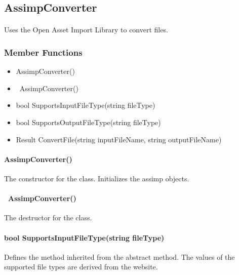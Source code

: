 \hypertarget{fileconversion_assimpconverter}
{
    \label{fileconversion_assimpconverter}
}

\subsection{AssimpConverter}
    \paragraph{}
        Uses the Open Asset Import Library to convert files.

    \subsubsection{Member Functions}

        \begin{itemize}
            \item AssimpConverter()
            \item ~AssimpConverter()
            \item bool SupportsInputFileType(string fileType)
            \item bool SupportsOutputFileType(string fileType)
            \item Result ConvertFile(string inputFileName, string outputFileName)
        \end{itemize}

        \paragraph{AssimpConverter()}
            \hfill \break
            The constructor for the class. Initializes the assimp objects.   
        
        \paragraph{~AssimpConverter()}
            \hfill \break
            The destructor for the class.

        \paragraph{bool SupportsInputFileType(string fileType)}
            \hfill \break
            Defines the method inherited from the abstract method.  The values of the supported file types are derived from the website.

